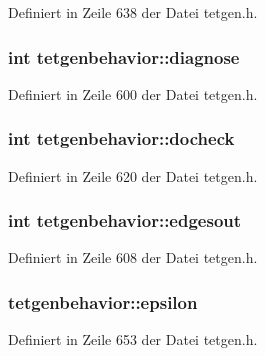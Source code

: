 Definiert in Zeile 638 der Datei tetgen.\-h.

\hypertarget{classtetgenbehavior_a40cd0446f3d881658ed5754a3002c46e}{
\subsubsection[{diagnose}]{\setlength{\rightskip}{0pt plus 5cm}int tetgenbehavior\-::diagnose}}\label{classtetgenbehavior_a40cd0446f3d881658ed5754a3002c46e}


Definiert in Zeile 600 der Datei tetgen.\-h.

\hypertarget{classtetgenbehavior_a96432e6759b2b6173f0f4e15b9d32540}{
\subsubsection[{docheck}]{\setlength{\rightskip}{0pt plus 5cm}int tetgenbehavior\-::docheck}}\label{classtetgenbehavior_a96432e6759b2b6173f0f4e15b9d32540}


Definiert in Zeile 620 der Datei tetgen.\-h.

\hypertarget{classtetgenbehavior_abd415eaf5e4f25b82ce6799128c910ed}{
\subsubsection[{edgesout}]{\setlength{\rightskip}{0pt plus 5cm}int tetgenbehavior\-::edgesout}}\label{classtetgenbehavior_abd415eaf5e4f25b82ce6799128c910ed}


Definiert in Zeile 608 der Datei tetgen.\-h.

\hypertarget{classtetgenbehavior_a65abc49ced365588d5c7bdfce638fab5}{
\subsubsection[{epsilon}]{ tetgenbehavior\-::epsilon}}\label{classtetgenbehavior_a65abc49ced365588d5c7bdfce638fab5}


Definiert in Zeile 653 der Datei tetgen.\-h.

